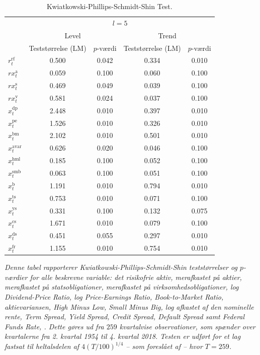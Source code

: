 \documentclass[
  a4paper,
  oneside]{memoir}
\begin{document}
\begin{table}[H]

\caption{\label{tab:STAT-KPSS}Kwiatkowski-Phillips-Schmidt-Shin Test.}
\centering
\begin{threeparttable}
\begin{tabular}[t]{lcccc}
\toprule
\multicolumn{1}{c}{ } & \multicolumn{4}{c}{$l=5$} \\
\cmidrule(l{3pt}r{3pt}){2-5}
\multicolumn{1}{c}{ } & \multicolumn{2}{c}{Level} & \multicolumn{2}{c}{Trend} \\
\cmidrule(l{3pt}r{3pt}){2-3} \cmidrule(l{3pt}r{3pt}){4-5}
  & Teststørrelse (LM) & $p$-værdi & Teststørrelse (LM) & $p$-værdi\\
\midrule
\rowcolor{gray!6}  $r_t^{\text{rf}}$ & 0.500 & 0.042 & 0.334 & 0.010\\
$rx_t^{\text{a}}$ & 0.059 & 0.100 & 0.060 & 0.100\\
\rowcolor{gray!6}  $rx_t^{\text{s}}$ & 0.469 & 0.049 & 0.039 & 0.100\\
$rx_t^{\text{v}}$ & 0.581 & 0.024 & 0.037 & 0.100\\
\rowcolor{gray!6}  $x_t^{\text{dp}}$ & 2.448 & 0.010 & 0.397 & 0.010\\
$x_t^{\text{pe}}$ & 1.526 & 0.010 & 0.326 & 0.010\\
\rowcolor{gray!6}  $x_t^{\text{bm}}$ & 2.102 & 0.010 & 0.501 & 0.010\\
$x_t^{\text{avar}}$ & 0.626 & 0.020 & 0.046 & 0.100\\
\rowcolor{gray!6}  $x_t^{\text{hml}}$ & 0.185 & 0.100 & 0.052 & 0.100\\
$x_t^{\text{smb}}$ & 0.063 & 0.100 & 0.051 & 0.100\\
\rowcolor{gray!6}  $x_t^{\text{b}}$ & 1.191 & 0.010 & 0.794 & 0.010\\
$x_t^{\text{ts}}$ & 0.753 & 0.010 & 0.071 & 0.100\\
\rowcolor{gray!6}  $x_t^{\text{ys}}$ & 0.331 & 0.100 & 0.132 & 0.075\\
$x_t^{\text{cs}}$ & 1.671 & 0.010 & 0.079 & 0.100\\
\rowcolor{gray!6}  $x_t^{\text{ds}}$ & 0.451 & 0.055 & 0.297 & 0.010\\
$x_t^{\text{fr}}$ & 1.155 & 0.010 & 0.754 & 0.010\\
\bottomrule
\end{tabular}
\begin{tablenotes}
\item \textit{Denne tabel rapporterer Kwiatkowski-Phillips-Schmidt-Shin teststørrelser og $p$-værdier for alle beskrevne variable: det risikofrie aktiv, merafkastet på aktier, merafkastet på statsobligationer, merafkastet på virksomhedsobligationer, log Dividend-Price Ratio, log Price-Earnings Ratio, Book-to-Market Ratio, aktievariansen, High Minus Low, Small Minus Big, log afkastet af den nominelle rente, Term Spread, Yield Spread, Credit Spread, Default Spread samt Federal Funds Rate, \citep{Kwiatkowski1992}. Dette gøres ud fra $259$ kvartalvise observationer, som spænder over kvartalerne fra 2. kvartal 1954 til 4. kvartal 2018. Testen er udført for et lag fastsat til heltalsdelen af $4(T/100)^{1/4}$ -- som foreslået af \citep{Schwert1989} -- hvor $T=259$.}

\end{tablenotes}
\end{threeparttable}
\end{table}
\end{document}
